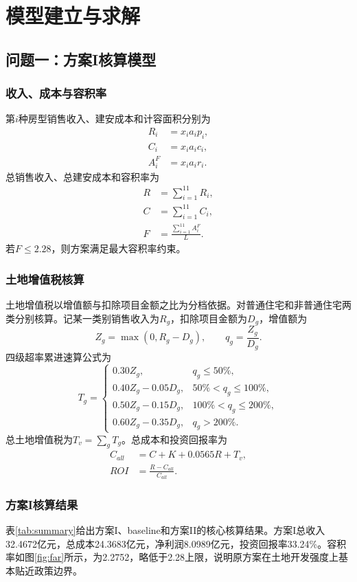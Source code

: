 \documentclass[UTF8,12pt,a4paper]{ctexart}
\begin{document}
\section{模型建立与求解}
\subsection{问题一：方案I核算模型}
\subsubsection{收入、成本与容积率}
第$i$种房型销售收入、建安成本和计容面积分别为
\begin{align}
R_i &= x_i a_i p_i,\\
C_i &= x_i a_i c_i,\\
A_i^F &= x_i a_i r_i.
\end{align}
总销售收入、总建安成本和容积率为
\begin{align}
R &= \sum_{i=1}^{11} R_i,\\
C &= \sum_{i=1}^{11} C_i,\\
F &= \frac{\sum_{i=1}^{11} A_i^F}{L}.
\end{align}
若$F\leq 2.28$，则方案满足最大容积率约束。

\subsubsection{土地增值税核算}
土地增值税以增值额与扣除项目金额之比为分档依据。对普通住宅和非普通住宅两类分别核算。记某一类别销售收入为$R_g$，扣除项目金额为$D_g$，增值额为
\begin{equation}
Z_g=\max(0,R_g-D_g),\qquad q_g=\frac{Z_g}{D_g}.
\end{equation}
四级超率累进速算公式为
\begin{equation}
T_g=\begin{cases}
0.30Z_g, & q_g\leq 50\%,\\
0.40Z_g-0.05D_g, & 50\%<q_g\leq100\%,\\
0.50Z_g-0.15D_g, & 100\%<q_g\leq200\%,\\
0.60Z_g-0.35D_g, & q_g>200\%.
\end{cases}
\end{equation}
总土地增值税为$T_v=\sum_g T_g$。总成本和投资回报率为
\begin{align}
C_{all}&=C+K+0.0565R+T_v,\\
ROI&=\frac{R-C_{all}}{C_{all}}.
\end{align}

\subsubsection{方案I核算结果}
表\ref{tab:summary}给出方案I、baseline和方案II的核心核算结果。方案I总收入32.4672亿元，总成本24.3683亿元，净利润8.0989亿元，投资回报率33.24\%。容积率如图\ref{fig:far}所示，为2.2752，略低于2.28上限，说明原方案在土地开发强度上基本贴近政策边界。
\end{document}

